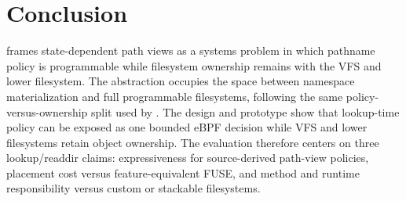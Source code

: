 \section{Conclusion}
\label{sec:conclusion}

\namei frames state-dependent path views as a systems problem in which pathname
policy is programmable while filesystem ownership remains with the VFS and lower
filesystem. The abstraction occupies the space between namespace materialization
and full programmable filesystems, following the same policy-versus-ownership
split used by . The design and prototype show that lookup-time
policy can be exposed as one bounded eBPF decision while VFS and lower
filesystems retain object ownership.
The evaluation therefore centers on three lookup/readdir claims:
expressiveness for source-derived path-view policies, placement cost versus
feature-equivalent FUSE, and method and runtime responsibility versus custom or
stackable filesystems.
